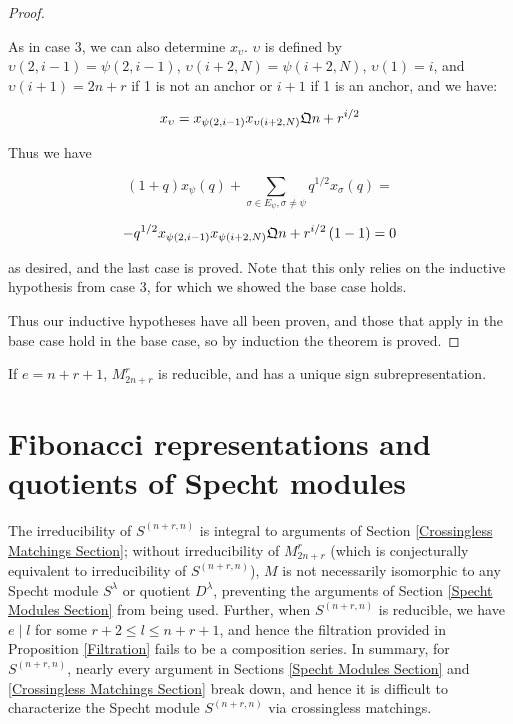 \documentclass{amsart}
\begin{document}
\begin{proof}
\begin{enumerate}[label={case \arabic*:}]
		As in case 3, we can also determine $x_\upsilon$. $\upsilon$ is defined by $\upsilon(2,i-1)=\psi(2,i-1)$, $\upsilon(i+2,N)=\psi(i+2,N)$, $\upsilon(1)=i$, and $\upsilon(i+1)=2n+r$ if 1 is not an anchor or $i+1$ if 1 is an anchor, and we have:
		
		$$x_\upsilon=x_{\psi(2,i-1)}x_{\upsilon(i+2,N)}\mathfrak{Q}{n+r}^{i/2}$$
		
		Thus we have
		
		$$(1+q)x_\psi(q)+\sum_{\sigma\in E_\psi,\sigma\not=\psi}q^{1/2}x_\sigma(q)=$$
		
		$$-q^{1/2}x_{\psi(2,i-1)}x_{\psi(i+2,N)}\mathfrak{Q}{n+r}^{i/2}\left( 1-1 \right)=0$$
		
		as desired, and the last case is proved. Note that this only relies on the inductive hypothesis from case 3, for which we showed the base case holds.
	\end{enumerate}
	
	Thus our inductive hypotheses have all been proven, and those that apply in the base case hold in the base case, so by induction the theorem is proved.
	
\end{proof}

\begin{corollary}
	If $e=n+r+1$, $M_{2n+r}^r$ is reducible, and has a unique sign subrepresentation.
\end{corollary}


\section{Fibonacci representations and quotients of Specht modules}\label{Fibonacci Section}
The irreducibility of $S^{(n+r,n)}$ is integral to arguments of Section \ref{Crossingless Matchings Section};
without irreducibility of $M_{2n + r}^r$ (which is conjecturally equivalent to irreducibility of $S^{(n+r,n)}$), $M$ is not necessarily isomorphic to any Specht module $S^\lambda$ or quotient $D^\lambda$, preventing the arguments of Section \ref{Specht Modules Section} from being used.
Further, when $S^{(n+r,n)}$ is reducible, we have $e \mid l$ for some $r+2 \leq l \leq n+r+1$, and hence the filtration provided in Proposition \ref{Filtration} fails to be a composition series.
In summary, for $S^{(n+r,n)}$, nearly every argument in Sections \ref{Specht Modules Section} and \ref{Crossingless Matchings Section} break down, and hence it is difficult to characterize the Specht module $S^{(n+r,n)}$ via crossingless matchings.
\end{document}
